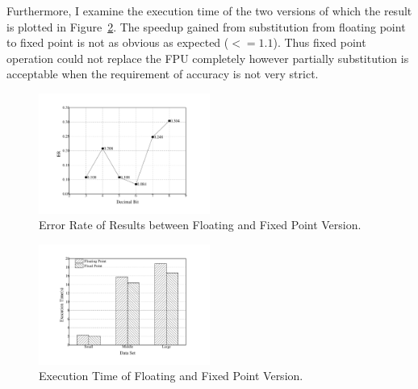Furthermore, I examine the execution time of the two versions of which the result is plotted in Figure~\ref{fig:execution_time}. The speedup gained from substitution from floating point to fixed point is not as obvious as expected ($<=1.1$). Thus fixed point operation could not replace the FPU completely however partially substitution is acceptable when the requirement of accuracy is not very strict.  

\begin{figure}
\centering
\includegraphics[width=0.50\textwidth]{graph/ER.pdf}
\caption{Error Rate of Results between Floating and Fixed Point Version.}
\label{fig:ER}
\end{figure}

\begin{figure}
\centering
\includegraphics[width=0.50\textwidth]{graph/execution_time.pdf}
\caption{Execution Time of Floating and Fixed Point Version.}
\label{fig:execution_time}
\end{figure}
